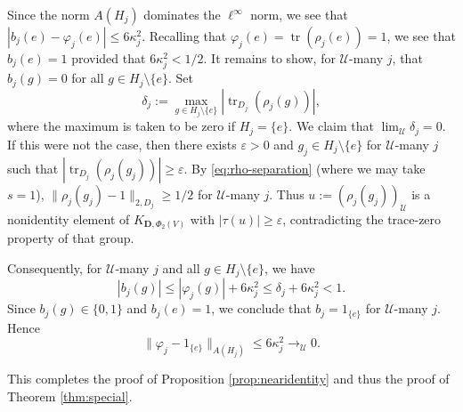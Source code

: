 \documentclass[12pt]{amsart}
\numberwithin{equation}{section}
\theoremstyle{definition}
\DeclareMathOperator{\tr}{tr}
\def \u{\mathcal U}
\begin{document}
Since the norm $A(H_j)$ dominates the $\ell^{\infty}$ norm, 
we see that $|b_j(e)-\varphi_j(e)|\leq 6\kappa_j^2$.  Recalling that $\varphi_j(e)=\tr(\rho_j(e))=1$, we see that $b_j(e)=1$ provided that $6\kappa_j^2<1/2$.  It remains to show, for $\u$-many $j$, that $b_j(g)=0$ for all
$g\in H_j\setminus\{e\}$. Set
\[
\delta_j:=
\max_{g\in H_j\setminus\{e\}}
|\operatorname{tr}_{D_j}(\rho_j(g))|,
\]
where the maximum is taken to be zero if $H_j=\{e\}$.
We claim that $\lim_{\mathcal U}\delta_j=0$.
If this were not the case, then there exists $\varepsilon>0$ and
$g_j\in H_j\setminus\{e\}$ for $\mathcal U$-many
$j$ such that
$|\operatorname{tr}_{D_j}(\rho_j(g_j))|
\ge\varepsilon$.
By \eqref{eq:rho-separation} (where we may take $s=1$),
$\|\rho_j(g_j)-1\|_{2,D_j}\ge1/2$
for $\mathcal U$-many $j$.
Thus $u:=(\rho_j(g_j))_{\mathcal U}$
is a nonidentity element of
$K_{\mathbf D,\Phi_2(V)}$ with
$|\tau(u)|\ge\varepsilon$, contradicting
the trace-zero property of that group.

Consequently, for $\u$-many $j$ and all $g\in H_j\setminus \{e\}$, we have
\[
|b_j(g)|
\le |\varphi_j(g)|+6\kappa_j^2
\le \delta_j+6\kappa_j^2<1.
\]
Since $b_j(g)\in\{0,1\}$ and $b_j(e)=1$,
we conclude that $b_j=1_{\{e\}}$ for
$\mathcal U$-many $j$. Hence
\[
\|\varphi_j-1_{\{e\}}\|_{A(H_j)}
\le6\kappa_j^2\longrightarrow_{\mathcal U}0.
\]

This completes the proof of Proposition \ref{prop:nearidentity} and thus the proof of Theorem \ref{thm:special}.



\end{document}
